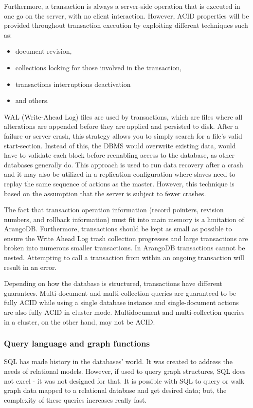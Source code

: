 Furthermore, a transaction is always a server-side operation that is executed in one go on the server, with no client interaction.
However, ACID properties will be provided throughout transaction execution by exploiting different techniques such as:
 \begin{itemize}[noitemsep]
	\item document revision,
	\item collections locking for those involved in the transaction,
	\item transactions interruptions deactivation
	\item and others.
\end{itemize}

WAL (Write-Ahead Log) files are used by transactions, which are files where all alterations are appended before they are applied and persisted to disk.
After a failure or server crash, this strategy allows you to simply search for a file's valid start-section.
Instead of this, the DBMS would overwrite existing data, would have to validate each block before reenabling access to the database, as other databases generally do.
This approach is used to run data recovery after a crash and it may also be utilized in a replication configuration where slaves need to replay the same sequence of actions as the master.
However, this technique is based on the assumption that the server is subject to fewer crashes.

The fact that transaction operation information (record pointers, revision numbers, and rollback information) must fit into main memory is a limitation of ArangoDB.
Furthermore, transactions should be kept as small as possible to ensure the Write Ahead Log trash collection progresses and large transactions are broken into numerous smaller transactions.
In ArangoDB transactions cannot be nested.
Attempting to call a transaction from within an ongoing transaction will result in an error.

Depending on how the database is structured, transactions have different guarantees.
Multi-document and multi-collection queries are guaranteed to be fully ACID while using a single database instance and single-document actions are also fully ACID in cluster mode.
Multidocument and multi-collection queries in a cluster, on the other hand, may not be ACID.

\subsubsection{Query language and graph functions}\label{subsubsection:LiteratureReview/ReviewofGraphDatabaseSystems/AGDBMSindetailArangoDB/Querylanguageandgraphfunctions}
SQL has made history in the databases' world.
It was created to address the needs of relational models.
However, if used to query graph structures, SQL does not excel - it was not designed for that.
It is possible with SQL to query or walk graph data mapped to a relational database and get desired data;
but, the complexity of these queries increases really fast.

